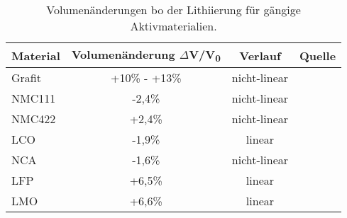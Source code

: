 \begin{table}[ht]
    \centering
    \caption{\label{tab:volume_change}Volumenänderungen bo der Lithiierung für gängige Aktivmaterialien.}
    \begin{tabular}[t]{lccc}
        \toprule
        Material& Volumenänderung $\Delta$V/V\textsubscript{0}&Verlauf&Quelle\\
        \midrule
        Grafit & +10\% - +13\% & nicht-linear & \cite{Qi2010,Woodford2012}\\
        NMC111 &-2,4\%&nicht-linear& \cite{Yabuuchi2005}\\
        NMC422 &+2,4\%&nicht-linear& \cite{Ma2007}\\
        LCO &-1,9\% & linear & \cite{Reimers1992}\\
        NCA &-1,6\% & nicht-linear& \cite{Itou2005}\\
        LFP &+6,5\% & linear & \cite{Padhi1997}\\
        LMO &+6,6\% & linear & \cite{Christensen2006}\\
        \bottomrule
    \end{tabular}
\end{table}